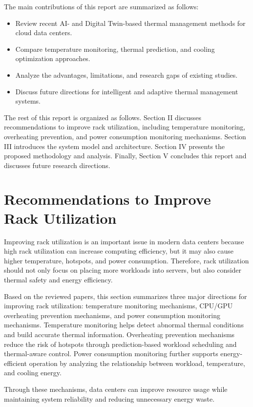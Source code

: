 \documentclass[conference]{IEEEtran}
\begin{document}
The main contributions of this report are summarized as follows:
\begin{itemize}
\item Review recent AI- and Digital Twin-based thermal management methods for cloud data centers.
\item Compare temperature monitoring, thermal prediction, and cooling optimization approaches.
\item Analyze the advantages, limitations, and research gaps of existing studies.
\item Discuss future directions for intelligent and adaptive thermal management systems.
\end{itemize}

The rest of this report is organized as follows. Section II discusses recommendations to improve rack utilization, including temperature monitoring, overheating prevention, and power consumption monitoring mechanisms. Section III introduces the system model and architecture. Section IV presents the proposed methodology and analysis. Finally, Section V concludes this report and discusses future research directions.
    
\section{Recommendations to Improve Rack Utilization}
Improving rack utilization is an important issue in modern data centers because high rack utilization can increase computing efficiency, but it may also cause higher temperature, hotspots, and power consumption. Therefore, rack utilization should not only focus on placing more workloads into servers, but also consider thermal safety and energy efficiency.

Based on the reviewed papers, this section summarizes three major directions for improving rack utilization: temperature monitoring mechanisms, CPU/GPU overheating prevention mechanisms, and power consumption monitoring mechanisms. Temperature monitoring helps detect abnormal thermal conditions and build accurate thermal information. Overheating prevention mechanisms reduce the risk of hotspots through prediction-based workload scheduling and thermal-aware control. Power consumption monitoring further supports energy-efficient operation by analyzing the relationship between workload, temperature, and cooling energy.

Through these mechanisms, data centers can improve resource usage while maintaining system reliability and reducing unnecessary energy waste.
\end{document}
